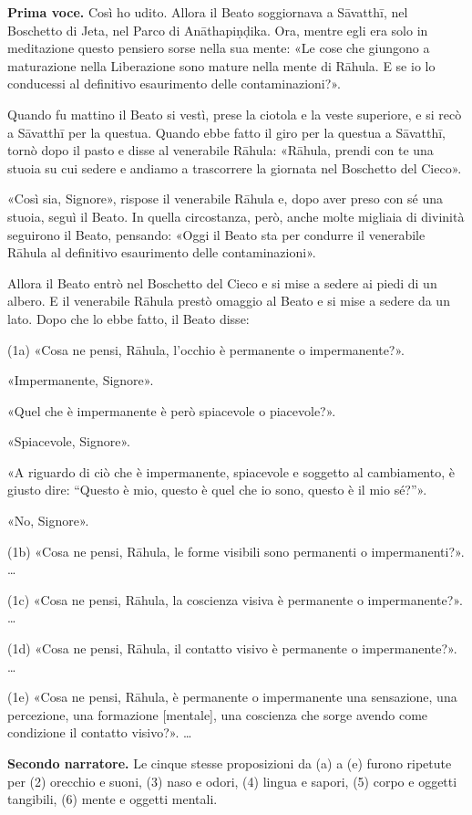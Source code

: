 \textbf{Prima voce.} Così ho udito. Allora il Beato soggiornava a Sāvatthī, nel
Boschetto di Jeta, nel Parco di Anāthapiṇḍika. Ora, mentre egli era solo
in meditazione questo pensiero sorse nella sua mente: «Le cose che
giungono a maturazione nella Liberazione sono mature nella mente di
Rāhula. E se io lo conducessi al definitivo esaurimento delle
contaminazioni?».


Quando fu mattino il Beato si vestì, prese la ciotola e la veste
superiore, e si recò a Sāvatthī per la questua. Quando ebbe fatto il
giro per la questua a Sāvatthī, tornò dopo il pasto e disse al
venerabile Rāhula: «Rāhula, prendi con te una stuoia su cui sedere e
andiamo a trascorrere la giornata nel Boschetto del Cieco».


«Così sia, Signore», rispose il venerabile Rāhula e, dopo aver preso con
sé una stuoia, seguì il Beato. In quella circostanza, però, anche molte
migliaia di divinità seguirono il Beato, pensando: «Oggi il Beato sta
per condurre il venerabile Rāhula al definitivo esaurimento delle
contaminazioni».


Allora il Beato entrò nel Boschetto del Cieco e si mise a sedere ai
piedi di un albero. E il venerabile Rāhula prestò omaggio al Beato e si
mise a sedere da un lato. Dopo che lo ebbe fatto, il Beato disse:


(1a) «Cosa ne pensi, Rāhula, l’occhio è permanente o impermanente?».


«Impermanente, Signore».


«Quel che è impermanente è però spiacevole o piacevole?».


«Spiacevole, Signore».


«A riguardo di ciò che è impermanente, spiacevole e soggetto al
cambiamento, è giusto dire: “Questo è mio, questo è quel che io sono,
questo è il mio sé?”».


«No, Signore».


(1b) «Cosa ne pensi, Rāhula, le forme visibili sono permanenti o
impermanenti?». …


(1c) «Cosa ne pensi, Rāhula, la coscienza visiva è permanente o
impermanente?». …


(1d) «Cosa ne pensi, Rāhula, il contatto visivo è permanente o
impermanente?». …


(1e) «Cosa ne pensi, Rāhula, è permanente o impermanente una sensazione,
una percezione, una formazione [mentale], una coscienza che sorge avendo
come condizione il contatto visivo?». …


\textbf{Secondo narratore.} Le cinque stesse proposizioni da (a) a (e) furono
ripetute per (2) orecchio e suoni, (3) naso e odori, (4) lingua e
sapori, (5) corpo e oggetti tangibili, (6) mente e oggetti mentali.


